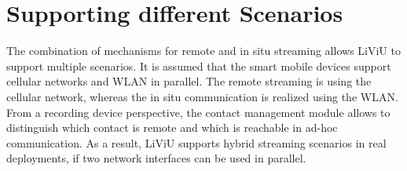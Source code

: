 \section{Supporting different Scenarios}
The combination of mechanisms for remote and in situ streaming allows \ac{LiViU} to support multiple scenarios.
It is assumed that the smart mobile devices support cellular networks and \ac{WLAN} in parallel.
The remote streaming is using the cellular network, whereas the in situ communication is realized using the \ac{WLAN}.
From a recording device perspective, the contact management module allows to distinguish which contact is remote and which is reachable in ad-hoc communication.
As a result, \ac{LiViU} supports hybrid streaming scenarios in real deployments, if two network interfaces can be used in parallel.
